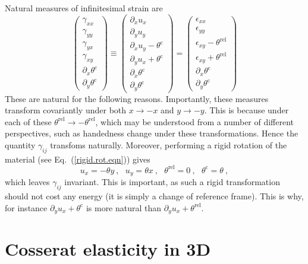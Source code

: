 \documentclass[]{scrreprt}
\newcommand{\pl}{\partial}
\newcommand{\thetac}{\theta^{\mathrm{c}}}
\newcommand{\thetarel}{\theta^{\mathrm{rel}}}
\newcommand{\ep}{\epsilon}
\newcommand{\ga}{\gamma}
\newcommand{\spa}{\ \ \ }
\begin{document}
Natural measures of infinitesimal strain are
\begin{equation}
\left(\begin{array}{c}
\gamma_{xx} \\
\gamma_{yy} \\
\gamma_{yx} \\
\gamma_{xy} \\
\pl_{x}\thetac \\
\pl_{y}\thetac
\end{array}
\right) \equiv
\left(\begin{array}{c}
\pl_{x}u_{x} \\
\pl_{y}u_{y} \\
\pl_{x}u_{y}-\thetac \\
\pl_{y}u_{x}+\thetac \\
\pl_{x}\thetac \\
\pl_{y}\thetac
\end{array}
\right) = 
\left(\begin{array}{c}
\ep_{xx} \\
\ep_{yy} \\
\ep_{xy}-\thetarel \\
\ep_{xy}+\thetarel \\
\pl_{x}\thetac \\
\pl_{y}\thetac
\end{array}
\right) 
\label{nat.2d.deform.measures}
\end{equation}
These are natural for the following reasons.  Importantly, these
measures transform covariantly under both 
$x\rightarrow -x$ and $y\rightarrow -y$.    This is
because under each of these $\thetarel\rightarrow -\thetarel$, which may be
understood from a number of different perspectives, such as handedness
change under these transformations.  Hence the quantity $\ga_{ij}$
transfoms naturally.  Moreover, performing a rigid rotation of the
material (see Eq.~(\ref{rigid.rot.eqn})) gives
$$
u_{x}=-\theta y \ , \spa
u_{y}=\theta x \ , \spa
\thetarel = 0 \ , \spa
\thetac = \theta \ ,
$$
which leaves $\ga_{ij}$ invariant.  This is important, as such a rigid
transformation should not cost any energy (it is simply a change of
reference frame).  This is why, for instance $\pl_{y}u_{x}+\thetac$ is
more natural than $\pl_{y}u_{x}+\thetarel$.



\chapter{Cosserat elasticity in 3D}
\label{3d.coss.elas.gen.sec}
\end{document}
